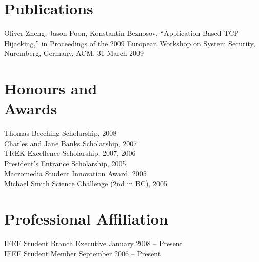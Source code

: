 \documentclass[margin,line]{resume}
\begin{document}
\begin{resume}
    \section{\mysidestyle Publications}
    Oliver Zheng, Jason Poon, Konstantin Beznosov, ``Application-Based TCP Hijacking,'' in Proceedings of the 2009 European Workshop on System Security, Nuremberg, Germany, ACM, 31 March 2009

    \section{\mysidestyle Honours and\\Awards} 

    Thomas Beeching Scholarship, 2008
        \vspace{1mm}\\%
    Charles and Jane Banks Scholarship, 2007
        \vspace{1mm}\\%
    TREK Excellence Scholarship, 2007, 2006
        \vspace{1mm}\\%
    President's Entrance Scholarship, 2005
        \vspace{1mm}\\%
    Macromedia Student Innovation Award, 2005
        \vspace{1mm}\\%
    Michael Smith Science Challenge (2nd in BC), 2005

    \section{\mysidestyle Professional Affiliation}
    IEEE Student Branch Executive \hfill January 2008 -- Present\vspace{1mm}\\
    IEEE Student Member \hfill September 2006 -- Present


\end{resume}
\end{document}
